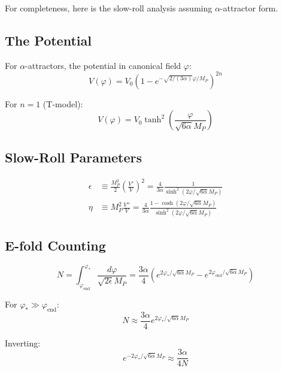 \documentclass[12pt,a4paper]{article}
\begin{document}
For completeness, here is the slow-roll analysis assuming $\alpha$-attractor form.

\subsection{The Potential}

For $\alpha$-attractors, the potential in canonical field $\varphi$:
\begin{equation}
V(\varphi) = V_0 \left(1 - e^{-\sqrt{2/(3\alpha)}\varphi/M_P}\right)^{2n}
\end{equation}

For $n = 1$ (T-model):
\begin{equation}
V(\varphi) = V_0 \tanh^2\left(\frac{\varphi}{\sqrt{6\alpha}M_P}\right)
\end{equation}

\subsection{Slow-Roll Parameters}

\begin{align}
\epsilon &\equiv \frac{M_P^2}{2}\left(\frac{V'}{V}\right)^2 = \frac{4}{3\alpha}\frac{1}{\sinh^2(2\varphi/\sqrt{6\alpha}M_P)} \\
\eta &\equiv M_P^2 \frac{V''}{V} = \frac{4}{3\alpha}\frac{1 - \cosh(2\varphi/\sqrt{6\alpha}M_P)}{\sinh^2(2\varphi/\sqrt{6\alpha}M_P)}
\end{align}

\subsection{E-fold Counting}

\begin{equation}
N = \int_{\varphi_{\text{end}}}^{\varphi_*} \frac{d\varphi}{\sqrt{2\epsilon}M_P} = \frac{3\alpha}{4}\left(e^{2\varphi_*/\sqrt{6\alpha}M_P} - e^{2\varphi_{\text{end}}/\sqrt{6\alpha}M_P}\right)
\end{equation}

For $\varphi_* \gg \varphi_{\text{end}}$:
\begin{equation}
N \approx \frac{3\alpha}{4} e^{2\varphi_*/\sqrt{6\alpha}M_P}
\end{equation}

Inverting:
\begin{equation}
e^{-2\varphi_*/\sqrt{6\alpha}M_P} \approx \frac{3\alpha}{4N}
\end{equation}
\end{document}
